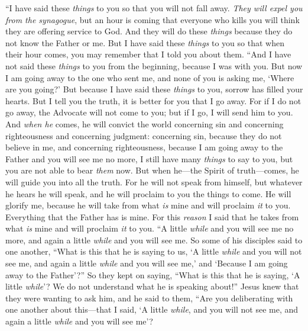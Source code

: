 \begin{biblechapter} %
 “I have said these \textit{things} to you so that you will not fall away.
\verse \textit{They will expel you from the synagogue}, but an hour is coming that everyone who kills you will think they are offering service to God.
\verse And they will do these \textit{things} because they do not know the Father or me.
\verse But I have said these \textit{things} to you so that when their hour comes, you may remember that I told you about them.
 “And I have not said these \textit{things} to you from the beginning, because I was with you.
\verse But now I am going away to the one who sent me, and none of you is asking me, ‘Where are you going?’
\verse But because I have said these \textit{things} to you, sorrow has filled your hearts.
\verse But I tell you the truth, it is better for you that I go away. For if I do not go away, the Advocate will not come to you; but if I go, I will send him to you.
\verse And \textit{when he} comes, he will convict the world concerning sin and concerning righteousness and concerning judgment:
\verse concerning sin, because they do not believe in me,
\verse and concerning righteousness, because I am going away to the Father and you will see me no more,
\verse I still have many \textit{things} to say to you, but you are not able to bear \textit{them} now.
\verse But when he—the Spirit of truth—comes, he will guide you into all the truth. For he will not speak from himself, but whatever he hears he will speak, and he will proclaim to you the things to come.
\verse He will glorify me, because he will take from what \textit{is} mine and will proclaim \textit{it} to you.
\verse Everything that the Father has is mine. For this \textit{reason} I said that he takes from what \textit{is} mine and will proclaim \textit{it} to you.
 “A little \textit{while} and you will see me no more, and again a little \textit{while} and you will see me.
\verse So some of his disciples said to one another, “What is this that he is saying to us, ‘A little \textit{while} and you will not see me, and again a little \textit{while} and you will see me,’ and ‘Because I am going away to the Father’?”
\verse So they kept on saying, “What is this that he is saying, ‘A little \textit{while}’? We do not understand what he is speaking about!”
\verse Jesus knew that they were wanting to ask him, and he said to them, “Are you deliberating with one another about this—that I said, ‘A little \textit{while}, and you will not see me, and again a little \textit{while} and you will see me’?

\end{biblechapter}
